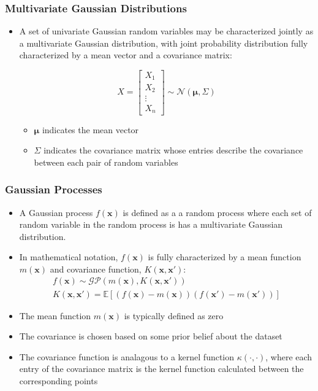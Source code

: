 \documentclass[pdf]{beamer}
\newcommand{\E}{\mathbb{E}}
\newcommand{\bx}{\boldsymbol{x}}
\begin{document}
\begin{frame}
  \frametitle{Multivariate Gaussian Distributions}

  \begin{itemize}
    \item A set of univariate Gaussian random variables may be characterized jointly as a multivariate Gaussian
      distribution, with joint probability distribution fully characterized by a mean vector and a covariance matrix:

      \[
        X = \begin{bmatrix}
                 X_{1} \\
                 X_{2} \\
                 \vdots \\
                 X_{n}
               \end{bmatrix}   \sim \mathcal{N}(\boldsymbol{\mu},\Sigma)
      \]
      \begin{itemize}
        \item $\boldsymbol{\mu}$ indicates the mean vector
        \item $\Sigma$ indicates the covariance matrix whose entries describe the covariance between each pair of random
          variables
      \end{itemize}
  \end{itemize}
\end{frame}

\begin{frame}
  \frametitle{Gaussian Processes}
  \begin{itemize}
    \item A Gaussian process $f(\boldsymbol{x})$ is defined as a a random process where each set of random variable in
      the random process is has a multivariate Gaussian distribution.
    \item In mathematical notation, $f(\boldsymbol{x})$ is fully characterized by a mean function  $m(\boldsymbol{x})$
      and covariance function, $K(\boldsymbol{x},\boldsymbol{x'})$:
      \begin{gather*}
        f(\boldsymbol{x})\sim\mathcal{GP}(m(\boldsymbol{x}),K(\boldsymbol{x},\boldsymbol{x'})) \\
        K(\bx, \bx') = \E[(f(\bx) - m(\bx))(f(\bx') - m(\bx'))]
      \end{gather*}

    \item The mean function $m(\bx)$ is typically defined as zero
    \item The covariance is chosen based on some prior belief about the dataset
    \item The covariance function is analagous to a kernel function $\kappa(\cdot, \cdot)$, where each entry of the
      covariance matrix is the kernel function calculated between the corresponding points
  \end{itemize}
\end{frame}
\end{document}
